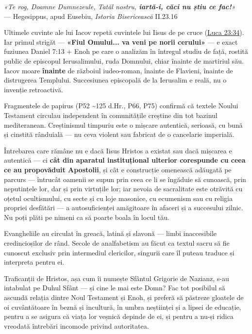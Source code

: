 \documentclass[12pt,a4paper,twoside,openany]{book}
\begin{document}
\begin{biblequote}
\textit{«Te rog, Doamne Dumnezeule, Tatăl nostru, \textbf{iartă-i, căci nu știu ce fac!}»} \\
{\small\color{gray}— Hegesippus, apud Eusebiu, \textit{Istoria Bisericească} II.23.16}
\end{biblequote}
Ultimele cuvinte ale lui Iacov repetă cuvintele lui Iisus de pe cruce (\href{https://bibliaortodoxa.ro/carte.php?id=48\&cap=23\#34}{Luca 23:34}). Iar primul strigăt — \textbf{«Fiul Omului... va veni pe norii cerului»} — e exact fuziunea Daniel 7:13 + Enoh pe care o analizăm în întregul studiu de față, rostită public de episcopul Ierusalimului, ruda Domnului, chiar înainte de martiriul său. Iacov moare \textbf{înainte} de războiul iudeo-roman, înainte de Flavieni, înainte de distrugerea Templului. Succesiunea episcopală de la Ierusalim e reală, nu o invenție retroactivă.

Fragmentele de papirus (P52 \textasciitilde{}125 d.Hr., P66, P75) confirmă că textele Noului Testament circulau independent în comunitățile creștine din tot bazinul mediteranean. Creștinismul timpuriu este o mișcare autentică, serioasă, cu bună și cinstită rânduială — nu ceva violent sau fabricat de o cancelarie imperială.

Întrebarea care rămâne nu e dacă Iisus Hristos a existat sau dacă mișcarea e autentică — ci \textbf{cât din aparatul instituțional ulterior corespunde cu ceea ce au propovăduit Apostolii}, și cât e construcție omenească adăugată pe parcurs — întrucât oamenii se supun prin ceea ce li se îngăduie să cunoască, prin neputințele lor, dar și prin virtuțile lor; iar nevoia de sacralitate este otrăvită cu oțetul ocultismului, cu secte și cu loje masonice, cu ecumenism sau cu religia propriei desfătări — a autosuficienței amăgitoare în afaceri și a succesului zilnic. Nu poți plăti pe nimeni ca să poarte boala în locul tău.

Evangheliile au circulat în greacă, latină și slavonă — limbi inaccesibile credincioșilor de rând. Secole de analfabetism au făcut ca textul sacru să fie cunoscut exclusiv prin intermediul clericilor, singurii care îl puteau traduce și interpreta pentru ei.

Traficanții de Hristos, așa cum îi numește Sfântul Grigorie de Nazianz, s-au intabulat pe Duhul Sfânt — și cine le mai este Domn? Fac tot posibilul să ascundă relația dintre Noul Testament și Enoh, și preferă să păstreze gloatele de oi cuvântătoare în beznă și incultură, în umbra neștiinței și a lipsei de educație, pentru a se asigura că viața lor veșnică depinde de ei, și pentru a nu-și ridica vreodată întrebări incomode privind autoritatea.
\end{document}
